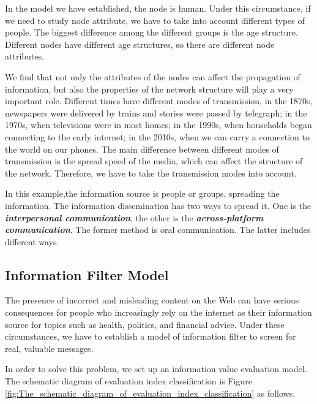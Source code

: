 \documentclass[a4paper,11pt]{article}
\begin{document}
\par In the model we have established, the node is human. Under this circumstance, if we need to study node attribute, we have to take into account different types of people. The biggest difference among the different groups is the age structure. Different nodes have different age structures, so there are different node attributes. 



\par We find that not only the attributes of the nodes can affect the propagation of information, but also the properties of the network structure will play a very important role. Different times have different modes of transmission, in the 1870s, newspapers were delivered by trains and stories were passed by telegraph; in the 1970s, when televisions were in most homes; in the 1990s, when households began connecting to the early internet; in the 2010s, when we can carry a connection to the world on our phones. The main difference between different modes of transmission is the spread speed of the media, which can affect the structure of the network. Therefore, we have to take the transmission modes into account. 

\par In this example,the information source is people or groups, spreading the information. The information dissemination has two ways to spread it. One is the \textbf{\emph{interpersonal communication}}, the other is the \textbf{\emph{across-platform communication}}. The former method is oral communication. The latter includes different ways.



\subsection{Information Filter Model}
\par The presence of incorrect and misleading content on the Web can have serious consequences for people who increasingly rely on the internet as their information source for topics such as health, politics, and financial advice\cite{RD}. Under these circumstances, we have to establish a model of information filter to screen for real, valuable messages.
\par In order to solve this problem, we set up an information value evaluation model. The schematic diagram of evaluation index classification is Figure \ref{fig:The_schematic_diagram_of_evaluation_index_classification} as follows.
\end{document}
